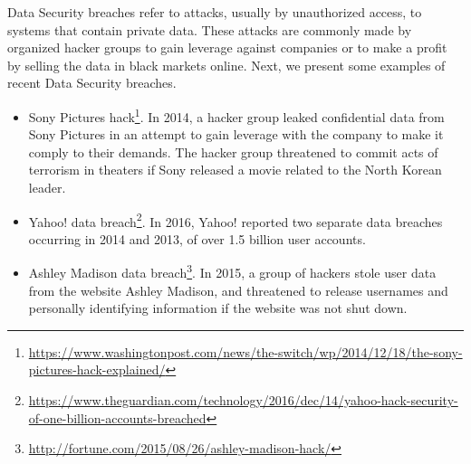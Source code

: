 Data Security breaches refer to attacks, usually by unauthorized access, to systems that contain private data. These attacks are commonly made by organized hacker groups to gain leverage against companies or to make a profit by selling the data in black markets online. Next, we present some examples of recent Data Security breaches.
\begin{itemize}
    \setlength\itemsep{1em}

    \item Sony Pictures hack\footnote{\url{https://www.washingtonpost.com/news/the-switch/wp/2014/12/18/the-sony-pictures-hack-explained/}}. In 2014, a hacker group leaked confidential data from Sony Pictures in an attempt to gain leverage with the company to make it comply to their demands. The hacker group threatened to commit acts of terrorism in theaters if Sony released a movie related to the North Korean leader.

    \item Yahoo! data breach\footnote{\url{https://www.theguardian.com/technology/2016/dec/14/yahoo-hack-security-of-one-billion-accounts-breached}}. In 2016, Yahoo! reported two separate data breaches occurring in 2014 and 2013, of over 1.5 billion user accounts.

    \item Ashley Madison data breach\footnote{\url{http://fortune.com/2015/08/26/ashley-madison-hack/}}. In 2015, a group of hackers stole user data from the website Ashley Madison, and threatened to release usernames and personally identifying information if the website was not shut down.


\end{itemize}




